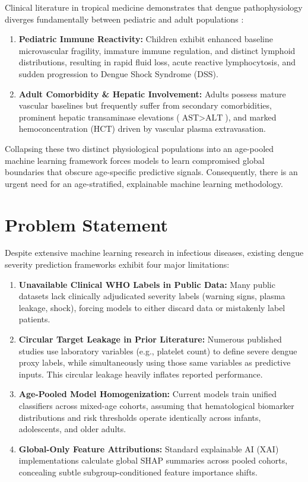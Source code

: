 \documentclass[12pt, a4paper]{report}
\begin{document}
Clinical literature in tropical medicine demonstrates that dengue pathophysiology diverges fundamentally between pediatric and adult populations \cite{potts2010, tanner2008, rajapakse2014}:
\begin{enumerate}
    \item \textbf{Pediatric Immune Reactivity:} Children exhibit enhanced baseline microvascular fragility, immature immune regulation, and distinct lymphoid distributions, resulting in rapid fluid loss, acute reactive lymphocytosis, and sudden progression to Dengue Shock Syndrome (DSS).
    \item \textbf{Adult Comorbidity \& Hepatic Involvement:} Adults possess mature vascular baselines but frequently suffer from secondary comorbidities, prominent hepatic transaminase elevations ($\text{AST} > \text{ALT}$), and marked hemoconcentration ($\text{HCT}$) driven by vascular plasma extravasation.
\end{enumerate}

Collapsing these two distinct physiological populations into an age-pooled machine learning framework forces models to learn compromised global boundaries that obscure age-specific predictive signals. Consequently, there is an urgent need for an age-stratified, explainable machine learning methodology.

\section{Problem Statement}
Despite extensive machine learning research in infectious diseases, existing dengue severity prediction frameworks exhibit four major limitations:
\begin{enumerate}
    \item \textbf{Unavailable Clinical WHO Labels in Public Data:} Many public datasets lack clinically adjudicated severity labels (warning signs, plasma leakage, shock), forcing models to either discard data or mistakenly label patients.
    \item \textbf{Circular Target Leakage in Prior Literature:} Numerous published studies use laboratory variables (e.g., platelet count) to define severe dengue proxy labels, while simultaneously using those same variables as predictive inputs. This circular leakage heavily inflates reported performance.
    \item \textbf{Age-Pooled Model Homogenization:} Current models train unified classifiers across mixed-age cohorts, assuming that hematological biomarker distributions and risk thresholds operate identically across infants, adolescents, and older adults.
    \item \textbf{Global-Only Feature Attributions:} Standard explainable AI (XAI) implementations calculate global SHAP summaries across pooled cohorts, concealing subtle subgroup-conditioned feature importance shifts.
\end{enumerate}
\end{document}
